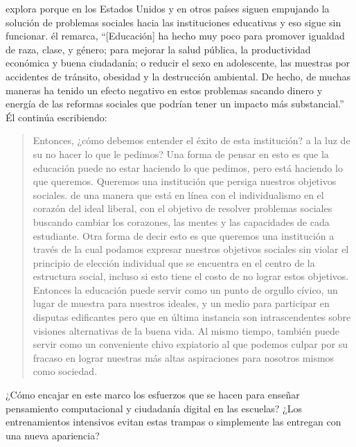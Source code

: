 
\cite{Laba2008} explora porque en los Estados Unidos y en otros países
siguen empujando la solución de problemas sociales hacia las instituciones educativas 
y eso sigue sin funcionar.
él remarca,
``[Educación] ha hecho muy poco para promover igualdad de raza, clase, y género;
para mejorar la salud pública, la productividad económica y buena ciudadanía;
o reducir el sexo en adolescente, las muestras por accidentes de tránsito, obesidad y la destrucción ambiental.
De hecho,
de muchas maneras ha tenido un efecto negativo en estos problemas
sacando dinero y energía de las reformas sociales que podrían tener un impacto más substancial.”
Él continúa escribiendo: 


\begin{quote}

  Entonces, ¿cómo debemos entender el éxito de esta institución?
a la luz de su no hacer lo que le pedimos?
Una forma de pensar en esto es que
la educación puede no estar haciendo lo que pedimos,
pero está haciendo lo que queremos.
Queremos una institución que persiga nuestros objetivos sociales.
de una manera que está en línea con el individualismo en el corazón del ideal liberal,
con el objetivo de resolver problemas sociales
buscando cambiar los corazones, las mentes y las capacidades de cada estudiante.
Otra forma de decir esto es que
queremos una institución a través de la cual podamos expresar nuestros objetivos sociales
sin violar el principio de elección individual
que se encuentra en el centro de la estructura social,
incluso si esto tiene el costo de no lograr estos objetivos.
Entonces la educación puede servir como un punto de orgullo cívico,
un lugar de muestra para nuestros ideales,
y un medio para participar en disputas edificantes pero  que en última instancia son intrascendentes
sobre visiones alternativas de la buena vida.
Al mismo tiempo,
también puede servir como un conveniente chivo expiatorio
al que podemos culpar por su fracaso en lograr nuestras más altas aspiraciones para nosotros mismos como sociedad.


\end{quote}

¿Cómo encajar en este marco los esfuerzos que se hacen para enseñar pensamiento computacional y ciudadanía digital en las escuelas?
¿Los entrenamientos intensivos evitan estas trampas o simplemente las entregan con una nueva apariencia?


